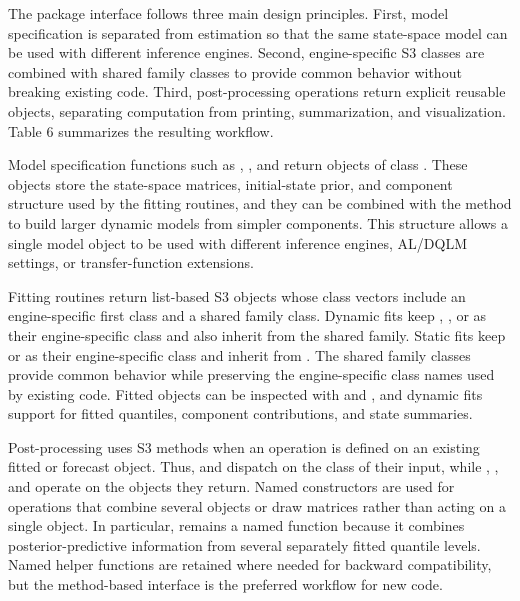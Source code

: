 \documentclass{jss}
\begin{document}
The package interface follows three main design principles. First, model specification is separated from estimation so that the same state-space model can be used with different inference engines. Second, engine-specific S3 classes are combined with shared family classes to provide common behavior without breaking existing code. Third, post-processing operations return explicit reusable objects, separating computation from printing, summarization, and visualization. Table 6 summarizes the resulting workflow.

Model specification functions such as , , and  return objects of class . These objects store the state-space matrices, initial-state prior, and component structure used by the fitting routines, and they can be combined with the \code{+} method to build larger dynamic models from simpler components.  This structure allows a single model object to be used with different inference engines, AL/DQLM settings, or transfer-function extensions.

Fitting routines return list-based S3 objects whose class vectors include an engine-specific first class and a shared family class. Dynamic fits keep , , or  as their engine-specific class and also inherit from the shared  family. Static fits keep  or  as
their engine-specific class and inherit from . The shared family classes provide common behavior while preserving the engine-specific class names used by existing code. Fitted objects can be inspected with  and , and dynamic fits support  for fitted quantiles, component contributions, and state summaries.

Post-processing uses S3 methods when an operation is defined on an existing fitted or forecast object. Thus,  and  dispatch on the class of their input, while , , and  operate on the objects they return. Named constructors are used for operations that combine several objects or draw matrices rather than acting on a single object. In particular,  remains a named function because it combines posterior-predictive information from several separately fitted quantile levels. Named helper functions are retained where needed for backward compatibility, but the method-based interface is the preferred workflow for new code.
\end{document}
